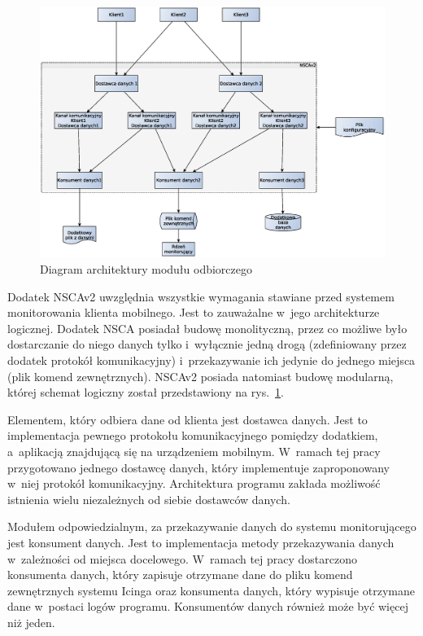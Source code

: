 \begin{figure}[ht]
  \caption{Diagram architektury modułu odbiorczego}
  \label{fig:odbiorczy}
  \centering
\includegraphics[width=1\textwidth]{img/odbiorczy}
\end{figure}

Dodatek NSCAv2 uwzględnia wszystkie wymagania stawiane przed systemem
monitorowania klienta mobilnego. Jest to zauważalne w~jego
architekturze logicznej. Dodatek NSCA posiadał budowę monolityczną,
przez co możliwe było dostarczanie do niego danych tylko i~wyłącznie
jedną drogą (zdefiniowany przez dodatek protokół komunikacyjny)
i~przekazywanie ich jedynie do jednego miejsca (plik komend
zewnętrznych). NSCAv2 posiada natomiast budowę modularną, której
schemat logiczny został przedstawiony na rys.~\ref{fig:odbiorczy}.

Elementem, który odbiera dane od klienta jest dostawca danych. Jest to
implementacja pewnego protokołu komunikacyjnego pomiędzy dodatkiem,
a~aplikacją znajdującą się na urządzeniem mobilnym. W~ramach tej pracy
przygotowano jednego dostawcę danych, który implementuje zaproponowany
w~niej protokół komunikacyjny. Architektura programu zakłada możliwość
istnienia wielu niezależnych od siebie dostawców danych.

Modułem odpowiedzialnym, za przekazywanie danych do systemu
monitorującego jest konsument danych. Jest to implementacja metody
przekazywania danych w~zależności od miejsca docelowego. W~ramach tej
pracy dostarczono konsumenta danych, który zapisuje otrzymane dane do
pliku komend zewnętrznych systemu Icinga oraz konsumenta danych, który
wypisuje otrzymane dane w~postaci logów programu. Konsumentów danych
również może być więcej niż jeden.

